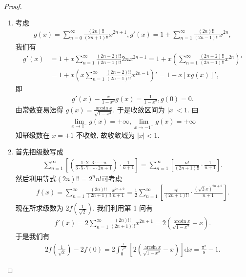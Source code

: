 \documentclass[../../main.tex]{subfiles}
\begin{document}
\begin{proof}
\begin{enumerate}
\item 考虑
\begin{align*}
g(x) = \sum_{n=0}^{\infty} \frac{(2n)!!}{(2n + 1)!!} x^{2n + 1}, g'(x) = 1 + \sum_{n=1}^{\infty} \frac{(2n)!!}{(2n - 1)!!} x^{2n},
\end{align*}
我们有
\begin{align*}
g'(x) &= 1 + x \sum_{n=1}^{\infty} \frac{(2n - 2)!!}{(2n - 1)!!} 2n x^{2n - 1} = 1 + x \left( \sum_{n=1}^{\infty} \frac{(2n - 2)!!}{(2n - 1)!!} x^{2n} \right)' \\
&= 1 + x \left( x \sum_{n=1}^{\infty} \frac{(2n - 2)!!}{(2n - 1)!!} x^{2n - 1} \right)' = 1 + x [x g(x)]',
\end{align*}
即
\begin{align*}
g'(x) - \frac{x}{1 - x^2} g(x) = \frac{1}{1 - x^2}, g(0) = 0.
\end{align*}
由常数变易法得 $g(x) = \frac{\arcsin x}{\sqrt{1 - x^2}}$. 于是收敛区间为 $|x| < 1$. 由
\begin{align*}
\lim_{x \to 1^-} g(x) = +\infty, \lim_{x \to -1^+} g(x) = +\infty
\end{align*}
知幂级数在 $x = \pm 1$ 不收敛, 故收敛域为 $|x| < 1$.
\item 首先把级数写成
\begin{align*}
\sum_{n=1}^{\infty} \left[ \left( \frac{1 \cdot 2 \cdot 3 \cdot \cdots \cdot n}{3 \cdot 5 \cdot 7 \cdot \cdots \cdot 2n + 1} \right) \cdot \frac{1}{n + 1} \right] = \sum_{n=1}^{\infty} \left[ \frac{n!}{(2n + 1)!!} \cdot \frac{1}{n + 1} \right].
\end{align*}
然后利用等式$(2n)!!=2^nn!$可考虑
\begin{align*}
f(x) = \sum_{n=1}^{\infty} \frac{(2n)!!}{(2n + 1)!!} \frac{x^{2n + 2}}{n + 1} = \frac{1}{2} \sum_{n=1}^{\infty} \left[ \frac{n!}{(2n + 1)!!} \cdot \frac{(\sqrt{2}x)^{2n + 2}}{n + 1} \right].
\end{align*}
现在所求级数为 $2f\left( \frac{1}{\sqrt{2}} \right)$.
我们利用第 1 问有
\begin{align*}
f'(x) = 2 \sum_{n=1}^{\infty} \frac{(2n)!!}{(2n + 1)!!} x^{2n + 1} = 2 \left( \frac{\arcsin x}{\sqrt{1 - x^2}} - x \right).
\end{align*}
于是我们有
\begin{align*}
2f\left( \frac{1}{\sqrt{2}} \right) - 2f(0) = 2 \int_0^{\frac{1}{\sqrt{2}}} \left[ 2 \left( \frac{\arcsin x}{\sqrt{1 - x^2}} - x \right) \right] \mathrm{d}x = \frac{\pi^2}{8} - 1.
\end{align*}
\end{enumerate}

\end{proof}
\end{document}
